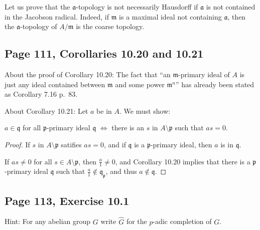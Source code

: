 \documentclass[parskip=half,fontsize=12pt]{scrartcl}%
\newcommand{\mf}{\mathfrak}
\newcommand{\aaa}{\mf a}
\newcommand{\mmm}{\mf m}
\newcommand{\ppp}{\mf p}
\newcommand{\qqq}{\mf q}
\begin{document}
Let us prove that the $\aaa$-topology is not necessarily Hausdorff if $\aaa$ is not contained in the Jacobson radical. Indeed, if $\mmm$ is a maximal ideal not containing $\aaa$, then the $\aaa$-topology of $A/\mmm$ is the coarse topology. 

\subsection{Page 111, Corollaries 10.20 and 10.21}%

About the proof of Corollary 10.20: The fact that ``an $\mmm$-primary ideal of $A$ is just any ideal contained between $\mmm$ and some power $\mmm^n$'' has already been stated as Corollary 7.16 p.~83.

About Corollary 10.21: Let $a$ be in $A$. We must show: 

$a\in\qqq$ for all $\ppp$-primary ideal $\qqq$ $\iff$ there is an $s$ in $A\setminus\ppp$ such that $as=0$. 

\begin{proof} 
If $s$ in $A\setminus\ppp$ satifies $as=0$, and if $\qqq$ is a $\ppp$-primary ideal, then $a$ is in $\qqq$.

If $as\neq0$ for all $s\in A\setminus\ppp$, then $\frac a1\neq0$, and Corollary 10.20 implies that there is a $\ppp$-primary ideal $\qqq$ such that $\frac a1\notin\qqq_\ppp$, and thus $a\notin\qqq$. 
\end{proof}

\subsection{Page 113, Exercise 10.1}%

Hint: For any abelian group $G$ write $\widehat G$ for the $p$-adic completion of $G$. 
\end{document}
